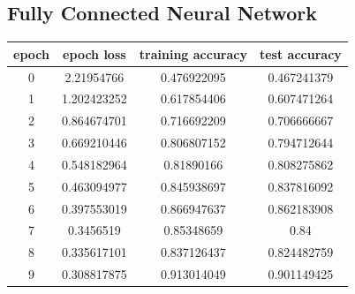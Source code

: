 \documentclass[10pt,Times New Roman]{article}
\begin{document}
    \subsection{Fully Connected Neural Network}
    \begin{center}
    \begin{tabular}{|c|c|c|c|}
    \hline
    epoch & epoch loss & training accuracy & test accuracy\\
    \hline
    0&    2.21954766&    0.476922095&    0.467241379\\
    \hline
    1&    1.202423252&    0.617854406&    0.607471264\\
    \hline
    2&    0.864674701&    0.716692209&    0.706666667\\
    \hline
    3&    0.669210446&    0.806807152&    0.794712644\\
    \hline
    4&    0.548182964&    0.81890166&    0.808275862\\
    \hline
    5&    0.463094977&    0.845938697&    0.837816092\\
    \hline
    6&    0.397553019&    0.866947637&    0.862183908\\
    \hline
    7&    0.3456519&    0.85348659&    0.84\\
    \hline
    8&    0.335617101&    0.837126437&    0.824482759\\
    \hline
    9&    0.308817875&    0.913014049&    0.901149425\\
    \hline
    \end{tabular}
    \end{center}
\end{document}
